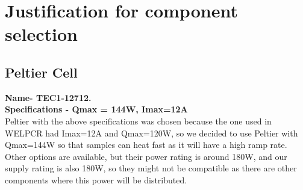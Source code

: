 \documentclass{article}
\begin{document}
\section{Justification for component selection}
\subsection{Peltier Cell}
\textbf{Name- TEC1-12712.\\}
\textbf{Specifications - Qmax = 144W, Imax=12A} \\
Peltier with the above specifications was chosen because the one used in WELPCR had Imax=12A and Qmax=120W, so we decided to use Peltier with Qmax=144W so that samples can heat fast as it will have a high ramp rate. Other options are available, but their power rating is around 180W, and our supply rating is also 180W, so they might not be compatible as there are other components where this power will be distributed.
\end{document}
